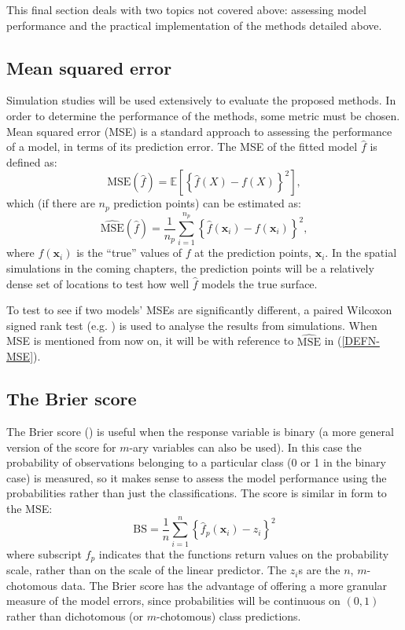 This final section deals with two topics not covered above: assessing model performance and the practical implementation of the methods detailed above.

\subsection{Mean squared error}
\label{intro-MSE}

Simulation studies will be used extensively to evaluate the proposed methods. In order to determine the performance of the methods, some metric must be chosen. Mean squared error (MSE) is a standard approach to assessing the performance of a model, in terms of its prediction error. The MSE of the fitted model $\hat{f}$ is defined as:
\begin{equation*}
\text{MSE}(\hat{f}) = \mathbb{E}\left [\left \{ \hat{f}(X) - f(X) \right \}^2 \right ],
\end{equation*}
which (if there are $n_p$ prediction points) can be estimated as:
\begin{equation}
\widehat{\text{MSE}}(\hat{f}) = \frac{1}{n_p} \sum_{i=1}^{n_p} \left \{\hat{f}(\mathbf{x}_i) - f(\mathbf{x}_i) \right \}^2,
\label{DEFN-MSE}
\end{equation}
where $f(\mathbf{x}_i)$ is the ``true'' values of $f$ at the prediction points, $\mathbf{x}_i$. In the spatial simulations in the coming chapters, the prediction points will be a relatively dense set of locations to test how well $\hat{f}$ models the true surface. 

To test to see if two models' MSEs are significantly different, a paired Wilcoxon signed rank test (e.g. \cite[pp.173-175]{wetherill}) is used to analyse the results from simulations. When MSE is mentioned from now on, it will be with reference to $\widehat{\text{MSE}}$ in (\ref{DEFN-MSE}).

\subsection{The Brier score}
\label{DEFN-brier}

The Brier score (\cite{brier50}) is useful when the response variable is binary (a more general version of the score for $m$-ary variables can also be used). In this case the probability of observations belonging to a particular class (0 or 1 in the binary case) is measured, so it makes sense to assess the model performance using the probabilities rather than just the classifications. The score is similar in form to the MSE:
\begin{equation}
\text{BS} = \frac{1}{n} \sum_{i=1}^{n} \left \{\hat{f}_p(\mathbf{x}_i)-z_i \right \}^2
\end{equation}
where subscript $f_p$ indicates that the functions return values on the probability scale, rather than on the  scale of the linear predictor. The $z_i$s are the $n$, $m$-chotomous data. The Brier score has the advantage of offering a more granular measure of the model errors, since probabilities will be continuous on $(0,1)$ rather than dichotomous (or $m$-chotomous) class predictions.

